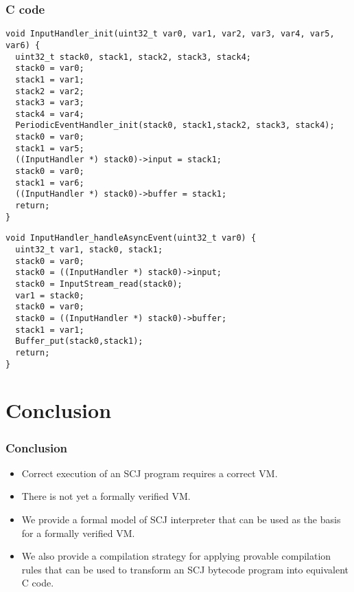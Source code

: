 \documentclass{beamer}
\begin{document}
\begin{frame}
  \frametitle{C code}
\begin{lstlisting}
void InputHandler_init(uint32_t var0, var1, var2, var3, var4, var5, var6) {
  uint32_t stack0, stack1, stack2, stack3, stack4;
  stack0 = var0;
  stack1 = var1;
  stack2 = var2;
  stack3 = var3;
  stack4 = var4;
  PeriodicEventHandler_init(stack0, stack1,stack2, stack3, stack4);
  stack0 = var0;
  stack1 = var5;
  ((InputHandler *) stack0)->input = stack1;
  stack0 = var0;
  stack1 = var6;
  ((InputHandler *) stack0)->buffer = stack1;
  return;
}
\end{lstlisting}
\begin{lstlisting}
void InputHandler_handleAsyncEvent(uint32_t var0) {
  uint32_t var1, stack0, stack1;
  stack0 = var0;
  stack0 = ((InputHandler *) stack0)->input;
  stack0 = InputStream_read(stack0);
  var1 = stack0;
  stack0 = var0;
  stack0 = ((InputHandler *) stack0)->buffer;
  stack1 = var1;
  Buffer_put(stack0,stack1);
  return;
}
\end{lstlisting}
\end{frame}


\section{Conclusion}

\begin{frame}
  \frametitle{Conclusion}
  \begin{itemize}
  \item Correct execution of an SCJ program requires a correct VM.
  \item There is not yet a formally verified VM.
  \item We provide a formal model of SCJ interpreter that can be
    used as the basis for a formally verified VM.
  \item We also provide a compilation strategy for applying provable
    compilation rules that can be used to transform an SCJ bytecode
    program into equivalent C code.
  \end{itemize}
\end{frame}
\end{document}

